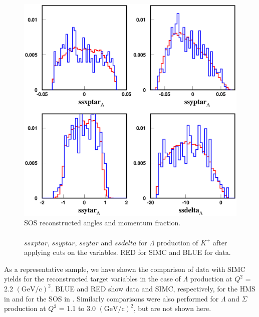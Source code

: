 \begin{figure}[!tbp]
  \centering
  \includegraphics[width=0.8\columnwidth]{com_plot_2_sos_2}
  \caption[SOS reconstructed angles and momentum fraction.]{\label{fig:com_plot_2_sos_2}SOS reconstructed angles and momentum fraction.\\\\ $ssxptar$, $ssyptar$, $ssytar$ and $ssdelta$ for $\Lambda$ production of $K^+$ after applying cuts on the variables. RED for SIMC and BLUE for data.}
\end{figure}

As a representative sample, we have shown the comparison of data with SIMC yields for the reconstructed target variables in the case of $\Lambda$ production at $Q^2$ = 2.2 $\mathrm{(GeV/c)^2}$. BLUE and RED show data and SIMC, respectively, for the HMS in  and for the SOS in . Similarly comparisons were also performed for $\Lambda$ and $\Sigma$ production at $Q^2$ = 1.1 to 3.0 $\mathrm{(GeV/c)^2}$, but are not shown here.

